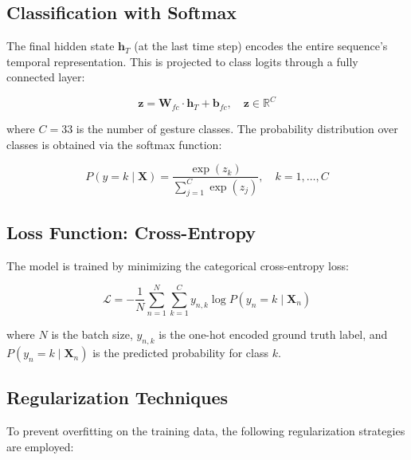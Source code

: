 \documentclass[12pt, a4paper]{article}
\begin{document}
\subsection{Classification with Softmax}

The final hidden state $\mathbf{h}_T$ (at the last time step) encodes the entire sequence's temporal representation. This is projected to class logits through a fully connected layer:

\begin{equation}
    \mathbf{z} = \mathbf{W}_{fc} \cdot \mathbf{h}_T + \mathbf{b}_{fc}, \quad \mathbf{z} \in \mathbb{R}^C
    \label{eq:fc}
\end{equation}

where $C = 33$ is the number of gesture classes. The probability distribution over classes is obtained via the softmax function:

\begin{equation}
    P(y = k \mid \mathbf{X}) = \frac{\exp(z_k)}{\sum_{j=1}^{C} \exp(z_j)}, \quad k = 1, \ldots, C
    \label{eq:softmax}
\end{equation}

\subsection{Loss Function: Cross-Entropy}

The model is trained by minimizing the categorical cross-entropy loss:

\begin{equation}
    \mathcal{L} = -\frac{1}{N} \sum_{n=1}^{N} \sum_{k=1}^{C} y_{n,k} \log P(y_n = k \mid \mathbf{X}_n)
    \label{eq:cross_entropy}
\end{equation}

where $N$ is the batch size, $y_{n,k}$ is the one-hot encoded ground truth label, and $P(y_n = k \mid \mathbf{X}_n)$ is the predicted probability for class $k$.

\subsection{Regularization Techniques}

To prevent overfitting on the training data, the following regularization strategies are employed:
\end{document}
